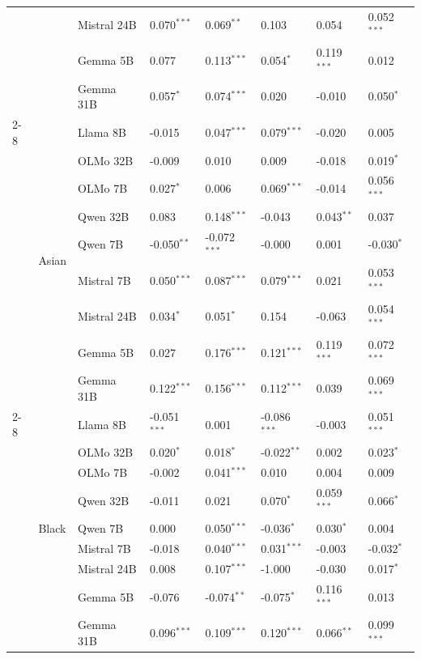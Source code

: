 \begin{longtable}[t]{llllllll}
 &  & Mistral 24B & 0.070$^{***}$ & 0.069$^{**}$ & 0.103 & 0.054 & 0.052$^{***}$ \\
 &  & Gemma 5B & 0.077 & 0.113$^{***}$ & 0.054$^{*}$ & 0.119$^{***}$ & 0.012 \\
 &  & Gemma 31B & 0.057$^{*}$ & 0.074$^{***}$ & 0.020 & -0.010 & 0.050$^{*}$ \\
\cline{2-8}
 & \multirow[t]{9}{*}{Asian} & Llama 8B & -0.015 & 0.047$^{***}$ & 0.079$^{***}$ & -0.020 & 0.005 \\
 &  & OLMo 32B & -0.009 & 0.010 & 0.009 & -0.018 & 0.019$^{*}$ \\
 &  & OLMo 7B & 0.027$^{*}$ & 0.006 & 0.069$^{***}$ & -0.014 & 0.056$^{***}$ \\
 &  & Qwen 32B & 0.083 & 0.148$^{***}$ & -0.043 & 0.043$^{**}$ & 0.037 \\
 &  & Qwen 7B & -0.050$^{**}$ & -0.072$^{***}$ & -0.000 & 0.001 & -0.030$^{*}$ \\
 &  & Mistral 7B & 0.050$^{***}$ & 0.087$^{***}$ & 0.079$^{***}$ & 0.021 & 0.053$^{***}$ \\
 &  & Mistral 24B & 0.034$^{*}$ & 0.051$^{*}$ & 0.154 & -0.063 & 0.054$^{***}$ \\
 &  & Gemma 5B & 0.027 & 0.176$^{***}$ & 0.121$^{***}$ & 0.119$^{***}$ & 0.072$^{***}$ \\
 &  & Gemma 31B & 0.122$^{***}$ & 0.156$^{***}$ & 0.112$^{***}$ & 0.039 & 0.069$^{***}$ \\
\cline{2-8}
 & \multirow[t]{9}{*}{Black} & Llama 8B & -0.051$^{***}$ & 0.001 & -0.086$^{***}$ & -0.003 & 0.051$^{***}$ \\
 &  & OLMo 32B & 0.020$^{*}$ & 0.018$^{*}$ & -0.022$^{**}$ & 0.002 & 0.023$^{*}$ \\
 &  & OLMo 7B & -0.002 & 0.041$^{***}$ & 0.010 & 0.004 & 0.009 \\
 &  & Qwen 32B & -0.011 & 0.021 & 0.070$^{*}$ & 0.059$^{***}$ & 0.066$^{*}$ \\
 &  & Qwen 7B & 0.000 & 0.050$^{***}$ & -0.036$^{*}$ & 0.030$^{*}$ & 0.004 \\
 &  & Mistral 7B & -0.018 & 0.040$^{***}$ & 0.031$^{***}$ & -0.003 & -0.032$^{*}$ \\
 &  & Mistral 24B & 0.008 & 0.107$^{***}$ & -1.000 & -0.030 & 0.017$^{*}$ \\
 &  & Gemma 5B & -0.076 & -0.074$^{**}$ & -0.075$^{*}$ & 0.116$^{***}$ & 0.013 \\
 &  & Gemma 31B & 0.096$^{***}$ & 0.109$^{***}$ & 0.120$^{***}$ & 0.066$^{**}$ & 0.099$^{***}$ \\

\end{longtable}
